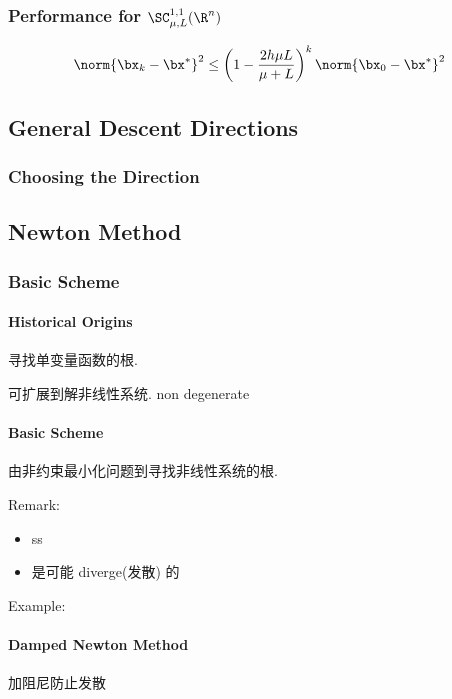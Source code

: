 \subsubsection{Performance for \texorpdfstring{$\SC_{\mu,L}^{1,1}(\R^n)$}. }

\begin{theorem}
    \begin{align*}
        \norm{\bx_k-\bx^*}^2\le \left( 1-\frac{2h\mu L}{\mu+L} \right)^k \norm{\bx_0-\bx^*}^2
    \end{align*}
\end{theorem}

\subsection{General Descent Directions}
\subsubsection{Choosing the Direction}


\subsection{Newton Method}
\subsubsection{Basic Scheme}
\paragraph{Historical Origins} 寻找单变量函数的根. 

可扩展到解非线性系统. non degenerate

\paragraph{Basic Scheme}由非约束最小化问题到寻找非线性系统的根.

Remark: 
\begin{itemize}
    \item ss
    \item 是可能 diverge(发散) 的
\end{itemize}

Example:

\paragraph{Damped Newton Method}加阻尼防止发散

